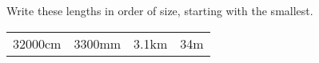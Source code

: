 \question
Write these lengths in order of size, starting with the smallest.\\
\begin{table}[H]
    \centering
    \begin{tabular}{p{2cm} p{2cm} p{2cm} p{2cm}}
       32000cm &3300mm& 3.1km &34m\\
    \end{tabular}
\end{table}

{}